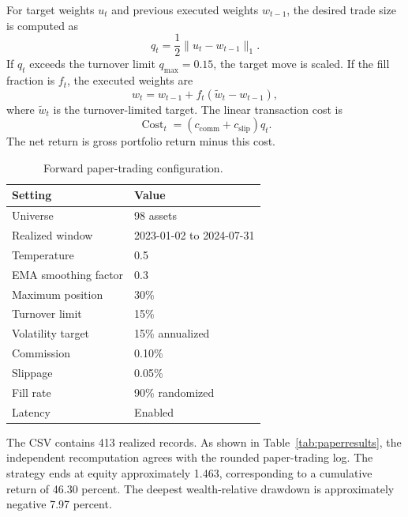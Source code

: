 \documentclass[10pt,a4paper,twocolumn]{article}
\begin{document}
For target weights $u_t$ and previous executed weights $w_{t-1}$, the desired trade size is computed as
\begin{equation}
q_t=\frac{1}{2}\lVert u_t-w_{t-1}\rVert_1.
\end{equation}
If $q_t$ exceeds the turnover limit $q_{\max}=0.15$, the target move is scaled. If the fill fraction is $f_t$, the executed weights are
\begin{equation}
w_t=w_{t-1}+f_t(\widetilde{w}_t-w_{t-1}),
\end{equation}
where $\widetilde{w}_t$ is the turnover-limited target. The linear transaction cost is
\begin{equation}
\operatorname{Cost}_t=(c_{\mathrm{comm}}+c_{\mathrm{slip}})q_t.
\end{equation}
The net return is gross portfolio return minus this cost.

\begin{table}[t]
\centering
\caption{Forward paper-trading configuration.}
\label{tab:paperconfig}
\small
\begin{tabular}{@{}ll@{}}
\toprule
Setting & Value \\
\midrule
Universe & 98 assets \\
Realized window & 2023-01-02 to 2024-07-31 \\
Temperature & 0.5 \\
EMA smoothing factor & 0.3 \\
Maximum position & 30\% \\
Turnover limit & 15\% \\
Volatility target & 15\% annualized \\
Commission & 0.10\% \\
Slippage & 0.05\% \\
Fill rate & 90\% randomized \\
Latency & Enabled \\
\bottomrule
\end{tabular}
\end{table}

The CSV contains 413 realized records. As shown in Table~\ref{tab:paperresults}, the independent recomputation agrees with the rounded paper-trading log. The strategy ends at equity approximately 1.463, corresponding to a cumulative return of 46.30 percent. The deepest wealth-relative drawdown is approximately negative 7.97 percent.
\end{document}
